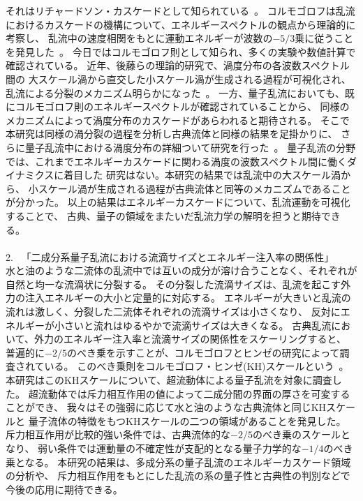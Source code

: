 \documentclass[12pt,a4paper]{jbook}
\begin{document}
    	それはリチャードソン・カスケードとして知られている~\cite{Richardson}。
	コルモゴロフは乱流におけるカスケードの機構について、エネルギースペクトルの観点から理論的に考察し、
    	乱流中の速度相関をもとに運動エネルギーが波数の$-5/3$乗に従うことを発見した~\cite{Kolmogorov}。
    	今日ではコルモゴロフ則として知られ、多くの実験や数値計算で確認されている。
   	 近年、後藤らの理論的研究で、渦度分布の各波数スペクトル間の
	大スケール渦から直交した小スケール渦が生成される過程が可視化され、乱流による分裂のメカニズム明らかになった~\cite{Goto1, Goto2, Goto3}。
	一方、量子乱流においても、既にコルモゴロフ則のエネルギースペクトルが確認されていることから、
	同様のメカニズムによって渦度分布のカスケードがあらわれると期待される。
	そこで本研究は同様の渦分裂の過程を分析し古典流体と同様の結果を足掛かりに、
	さらに量子乱流中における渦度分布の詳細ついて研究を行った~\cite{paper1}。
	量子乱流の分野では、これまでエネルギーカスケードに関わる渦度の波数スペクトル間に働くダイナミクスに着目した
	研究はない。本研究の結果では乱流中の大スケール渦から、
	小スケール渦が生成される過程が古典流体と同等のメカニズムであることが分かった。
    	以上の結果はエネルギーカスケードについて、乱流運動を可視化することで、
    	古典、量子の領域をまたいだ乱流力学の解明を担うと期待できる。
    	\\
    	\\
	2. \ 「二成分系量子乱流における流滴サイズとエネルギー注入率の関係性」
    	\\
    	水と油のような二流体の乱流中では互いの成分が溶け合うことなく、それぞれが自然と均一な流滴状に分裂する。
    	その分裂した流滴サイズは、乱流を起こす外力の注入エネルギーの大小と定量的に対応する。
    	エネルギーが大きいと乱流の流れは激しく、分裂した二流体それぞれの流滴サイズは小さくなり、
    	反対にエネルギーが小さいと流れはゆるやかで流滴サイズは大きくなる。
	古典乱流において、外力のエネルギー注入率と流滴サイズの関係性をスケーリングすると、
    	普遍的に$-2/5$のべき乗を示すことが、コルモゴロフとヒンゼの研究によって調査されている。
	このべき乗則をコルモゴロフ・ヒンゼ(KH)スケールという~\cite{Kolmogorov49, Hinze}。
	本研究はこのKHスケールについて、超流動体による量子乱流を対象に調査した。
	超流動体では斥力相互作用の値によって二成分間の界面の厚さを可変することができ、
    	我々はその強弱に応じて水と油のような古典流体と同じKHスケールと
	量子流体の特徴をもつKHスケールの二つの領域があることを発見した。
	斥力相互作用が比較的強い条件では、古典流体的な$-2/5$のべき乗のスケールとなり、
	弱い条件では運動量の不確定性が支配的となる量子力学的な$-1/4$のべき乗となる。
    	本研究の結果は、多成分系の量子乱流のエネルギーカスケード領域の分析や、
	斥力相互作用をもとにした乱流の系の量子性と古典性の判別などで今後の応用に期待できる。
    	\\
\end{document}

